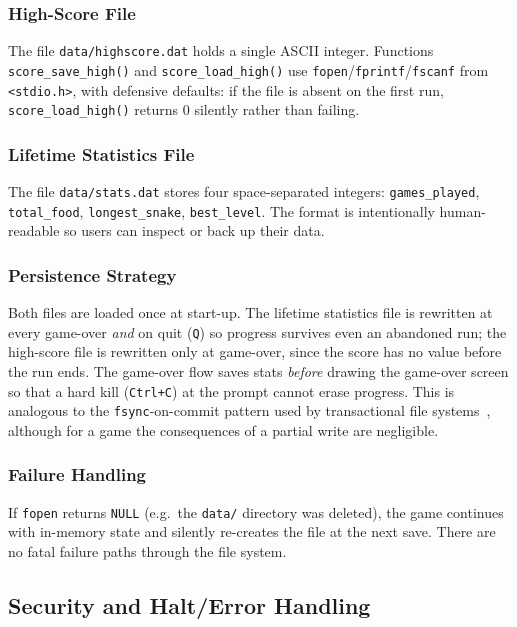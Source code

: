 \documentclass[conference]{IEEEtran}
\begin{document}
\subsubsection{High-Score File}
The file \texttt{data/highscore.dat} holds a single ASCII integer. Functions \texttt{score\_save\_high()} and \texttt{score\_load\_high()} use \texttt{fopen}/\texttt{fprintf}/\texttt{fscanf} from \texttt{<stdio.h>}, with defensive defaults: if the file is absent on the first run, \texttt{score\_load\_high()} returns 0 silently rather than failing.

\subsubsection{Lifetime Statistics File}
The file \texttt{data/stats.dat} stores four space-separated integers: \texttt{games\_played}, \texttt{total\_food}, \texttt{longest\_snake}, \texttt{best\_level}. The format is intentionally human-readable so users can inspect or back up their data.

\subsubsection{Persistence Strategy}
Both files are loaded once at start-up. The lifetime statistics file is rewritten at every game-over \emph{and} on quit (\texttt{Q}) so progress survives even an abandoned run; the high-score file is rewritten only at game-over, since the score has no value before the run ends. The game-over flow saves stats \emph{before} drawing the game-over screen so that a hard kill (\texttt{Ctrl+C}) at the prompt cannot erase progress. This is analogous to the \texttt{fsync}-on-commit pattern used by transactional file systems~\cite{silberschatz2018}, although for a game the consequences of a partial write are negligible.

\subsubsection{Failure Handling}
If \texttt{fopen} returns \texttt{NULL} (e.g.\ the \texttt{data/} directory was deleted), the game continues with in-memory state and silently re-creates the file at the next save. There are no fatal failure paths through the file system.

\subsection{Security and Halt/Error Handling}
\label{sec:sec}
\end{document}
